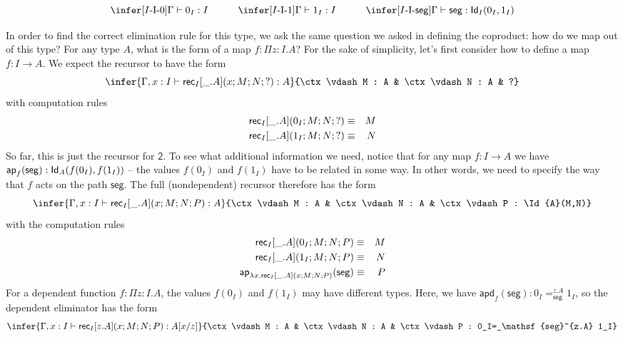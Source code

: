 \documentclass[11pt]{article}
\newcommand*{\Bool}{\mathsf{2}}
\newcommand*{\Interval}{I}
\newcommand*{\Izero}{0_I}
\newcommand*{\Ione}{1_I}
\newcommand*{\Iseg}{\mathsf{seg}}
\newcommand*{\ap}{\mathsf{ap}}
\newcommand*{\apd}{\mathsf{apd}}
\begin{document}
\begin{equation*}
  \infer[\Interval\text{-I-0}]{\ctx \vdash \Izero : \Interval}{}
  \hspace{30pt}
  \infer[\Interval\text{-I-1}]{\ctx \vdash \Ione : \Interval}{}
  \hspace{30pt}
  \infer[\Interval\text{-I-\textsf{seg}}]{\ctx \vdash \Iseg : \Id{\Interval}(\Izero,\Ione)}{}
\end{equation*}

In order to find the correct elimination rule for this type, we ask the same question we asked in defining the coproduct: how do we map out of this type? For any type $A$, what is the form of a map $f : \Pi z{:}I. A$? For the sake of simplicity, let's first consider how to define a map $f : I \to A$. We expect the recursor to have the form
\begin{equation*}
  \infer{\ctx, x : I \vdash \rec_\Interval[\_.A](x;M;N;?) : A}{\ctx \vdash M : A & \ctx \vdash N : A & ?}
\end{equation*}
with computation rules 
\begin{eqnarray*}
  \rec_\Interval[\_.A](\Izero;M;N;?) &\jdeq& M \\
  \rec_\Interval[\_.A](\Ione;M;N;?) &\jdeq& N
\end{eqnarray*}
So far, this is just the recursor for $\Bool$. To see what additional information we need, notice that for any map $f : I \to A$ we have $\ap_f(\Iseg) : \Id{A}(f(\Izero), f(\Ione))$ -- the values $f(\Izero)$ and $f(\Ione)$ have to be related in some way. In other words, we need to specify the way that $f$ acts on the path $\Iseg$. The full (nondependent) recursor therefore has the form
\begin{equation*}
  \infer{\ctx, x : I \vdash \rec_\Interval[\_.A](x;M;N;P) : A}{\ctx \vdash M : A & \ctx \vdash N : A & \ctx \vdash P : \Id{A}(M,N)}
\end{equation*}
with the computation rules
\begin{eqnarray*}
  \rec_\Interval[\_.A](\Izero;M;N;P) &\jdeq& M \\
  \rec_\Interval[\_.A](\Ione;M;N;P) &\jdeq& N \\
  \ap_{\lambda x.\rec_\Interval[\_.A](x;M;N;P)}(\Iseg) &\jdeq& P
\end{eqnarray*}
For a dependent function $f : \Pi z{:}I. A$, the values $f(\Izero)$ and $f(\Ione)$ may have different types. Here, we have $\apd_f(\Iseg) : \Izero =_\Iseg^{z.A} \Ione$, so the dependent eliminator has the form
\begin{equation*}
  \infer{\ctx, x : I \vdash \rec_\Interval[z.A](x;M;N;P) : A[x/z]}{\ctx \vdash M : A & \ctx \vdash N : A & \ctx \vdash P : \Izero =_\Iseg^{z.A} \Ione}
\end{equation*}
\end{document}
